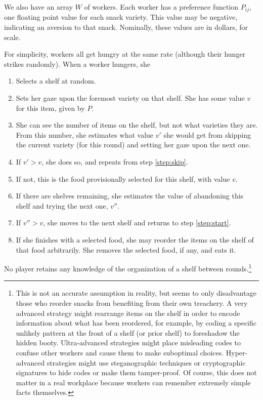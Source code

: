 \documentclass[twocolumn]{article}
\begin{document}
We also have an array $W$ of workers. Each worker has a preference function $P_{ij}$, one floating point value for each snack variety. This value may be negative, indicating an aversion to that snack. Nominally, these values are in dollars, for scale.

For simplicity, workers all get hungry at the same rate (although their hunger strikes randomly). When a worker hungers, she

\begin{enumerate}
\item Selects a shelf at random.
\item Sets her gaze upon the foremost variety on that shelf. She has some value $v$ for this item, given by $P$. \label{step:start}
\item She can see the number of items on the shelf, but not what varieties they are. From this number, she estimates what value $v'$ she would get from skipping the current variety (for this round) and setting her gaze upon the next one. \label{step:skip}
\item If $v' > v$, she does so, and repeats from step \ref{step:skip}.
\item If not, this is the food provisionally selected for this shelf, with value $v$.
\item If there are shelves remaining, she estimates the value of abandoning this shelf and trying the next one, $v''$.
\item If $v'' > v$, she moves to the next shelf and returns to step \ref{step:start}.
\item If she finishes with a selected food, she may reorder the items on the shelf of that food arbitrarily. She removes the selected food, if any, and eats it.
\end{enumerate}

No player retains any knowledge of the organization of a shelf between rounds.\footnote{This is not an accurate assumption in reality, but seems to only disadvantage those who reorder snacks from benefiting from their own treachery. A very advanced strategy might rearrange items on the shelf in order to encode information about what has been reordered, for example, by coding a specific unlikely pattern at the front of a shelf (or prior shelf) to foreshadow the hidden booty. Ultra-advanced strategies might place misleading codes to confuse other workers and cause them to make suboptimal choices. Hyper-advanced strategies might use steganographic techniques or cryptographic signatures to hide codes or make them tamper-proof. Of course, this does not matter in a real workplace because workers can remember extremely simple facts themselves.}
\end{document}
